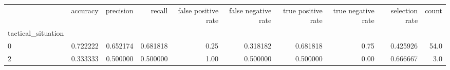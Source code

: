 \begin{tabular}{lrrrrrrrrr}
\toprule
{} &  accuracy &  precision &    recall &  false positive rate &  false negative rate &  true positive rate &  true negative rate &  selection rate &  count \\
tactical\_situation &           &            &           &                      &                      &                     &                     &                 &        \\
\midrule
0                  &  0.722222 &   0.652174 &  0.681818 &                 0.25 &             0.318182 &            0.681818 &                0.75 &        0.425926 &   54.0 \\
2                  &  0.333333 &   0.500000 &  0.500000 &                 1.00 &             0.500000 &            0.500000 &                0.00 &        0.666667 &    3.0 \\
\bottomrule
\end{tabular}
